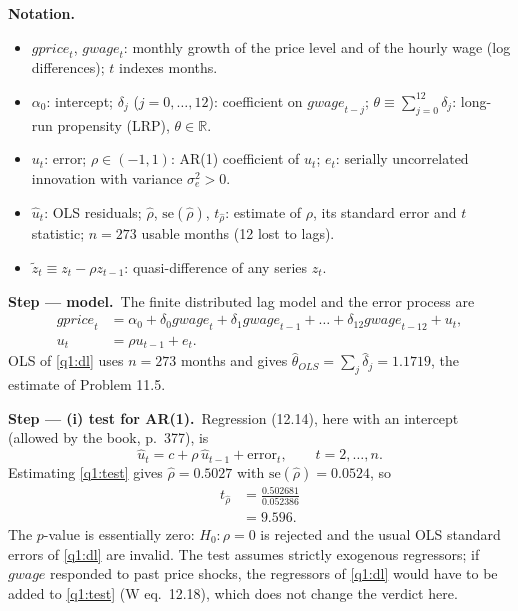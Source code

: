 \documentclass[11pt,a4paper]{article}
\numberwithin{equation}{questao}
\newenvironment{notacao}{\par\smallskip\noindent\textbf{Notation.}\begin{itemize}[leftmargin=1.4em,topsep=1pt,itemsep=0pt]\small}{\end{itemize}}
\newcommand{\passo}[2]{\par\smallskip\noindent\textbf{Step --- #1.}~#2}
\newcommand{\var}[1]{\mathit{#1}}
\begin{document}
\begin{sol}
\begin{notacao}
\item $\var{gprice}_t$, $\var{gwage}_t$: monthly growth of the price level and of the hourly wage (log differences); $t$ indexes months.
\item $\alpha_0$: intercept; $\delta_j$ ($j=0,\dots,12$): coefficient on $\var{gwage}_{t-j}$; $\theta\equiv\sum_{j=0}^{12}\delta_j$: long-run propensity (LRP), $\theta\in\mathbb{R}$.
\item $u_t$: error; $\rho\in(-1,1)$: AR(1) coefficient of $u_t$; $e_t$: serially uncorrelated innovation with variance $\sigma_e^2>0$.
\item $\hat u_t$: OLS residuals; $\hat\rho$, $\mathrm{se}(\hat\rho)$, $t_{\hat\rho}$: estimate of $\rho$, its standard error and $t$ statistic; $n=273$ usable months (12 lost to lags).
\item $\tilde z_t\equiv z_t-\rho z_{t-1}$: quasi-difference of any series $z_t$.
\end{notacao}

\passo{model}{The finite distributed lag model and the error process are
\begin{align}
\var{gprice}_t &= \alpha_0+\delta_0\var{gwage}_t+\delta_1\var{gwage}_{t-1}+\dots+\delta_{12}\var{gwage}_{t-12}+u_t, \label{q1:dl}\\
u_t &= \rho u_{t-1}+e_t. \label{q1:ar1}
\end{align}
OLS of \eqref{q1:dl} uses $n=273$ months and gives $\hat\theta_{OLS}=\sum_j\hat\delta_j=1.1719$, the
estimate of Problem 11.5.}

\passo{(i) test for AR(1)}{Regression (12.14), here with an intercept (allowed by the book, p.~377), is
\begin{equation}
\hat u_t = c+\rho\,\hat u_{t-1}+\text{error}_t,\qquad t=2,\dots,n. \label{q1:test}
\end{equation}
Estimating \eqref{q1:test} gives $\hat\rho=0.5027$ with $\mathrm{se}(\hat\rho)=0.0524$, so
\begin{align*}
t_{\hat\rho} &= \frac{0.502681}{0.052386}\\
&= 9.596.
\end{align*}
The $p$-value is essentially zero: $H_0\colon\rho=0$ is rejected and the usual OLS standard errors of
\eqref{q1:dl} are invalid. The test assumes strictly exogenous regressors; if $\var{gwage}$ responded
to past price shocks, the regressors of \eqref{q1:dl} would have to be added to \eqref{q1:test}
(W eq.~12.18), which does not change the verdict here.}


\end{sol}
\end{document}
